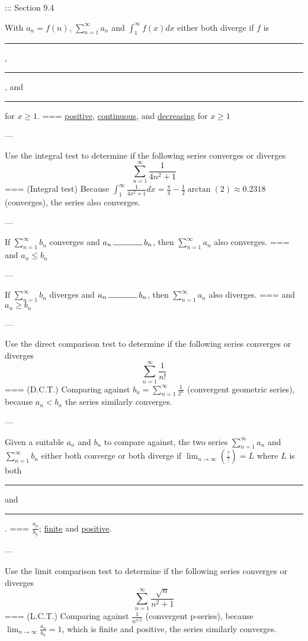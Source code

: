 ::: Section 9.4


With \(a_n=f(n)\), \(\sum_{n=1}^\infty a_n\) and \(\int_1^\infty f(x)dx\)
either both diverge if \(f\) is \rule{1cm}{0.15mm}, \rule{1cm}{0.15mm}, and
\rule{1cm}{0.15mm} for \(x\geq 1\).
===
\underline{positive}, \underline{continuous}, and \underline{decreasing} for
\(x\geq 1\)

---

Use the integral test to determine if the following series converges or diverges
\[\sum_{n=1}^\infty \frac{1}{4n^2+1}\]
===
(Integral test) Because \(\int_1^\infty
\frac{1}{4x^2+1}dx=\frac{\pi}{4}-\frac{1}{2}\arctan(2)\approx 0.2318\)
(converges), the series also converges.

---


If \(\sum_{n=1}^\infty b_n\) converges and \(a_n\,\rule{1.25cm}{0.15mm}\,b_n\),
then \(\sum_{n=1}^\infty a_n\) also converges.
===
and \(a_n\leq b_n\)

---

If \(\sum_{n=1}^\infty b_n\) diverges and \(a_n\,\rule{1.25cm}{0.15mm}\,b_n\),
then \(\sum_{n=1}^\infty a_n\) also diverges.
===
and \(a_n\geq b_n\)

---

Use the direct comparison test to determine if the following series converges or
diverges
\[\sum_{n=1}^\infty \frac{1}{n!}\]
===
(D.C.T.) Comparing against \(b_n=\sum_{n=1}^\infty \frac{1}{2^n}\) (convergent
geometric series), because \(a_n<b_n\) the series similarly converges.

---


Given a suitable \(a_n\) and \(b_n\) to compare against, the two series
\(\sum_{n=1}^\infty a_n\) and \(\sum_{n=1}^\infty b_n\) either both converge or
both diverge if
\(\lim_{n\to\infty}\left(\frac{\underline{?}}{\underline{?}}\right)=L\) where
\(L\) is both \rule{1cm}{0.15mm} and \rule{1cm}{0.15mm}.
===
\(\frac{\underline{a_n}}{\underline{b_n}}\); \underline{finite} and
\underline{positive}.

---

Use the limit comparison test to determine if the following series converges or
diverges
\[\sum_{n=1}^\infty \frac{\sqrt{n}}{n^2+1}\]
===
(L.C.T.) Comparing against \(\frac{1}{n^{3/2}}\) (convergent p-series), because
\(\lim_{n\to\infty}\frac{a_n}{b_n}=1\), which is finite and positive, the series
similarly converges.

